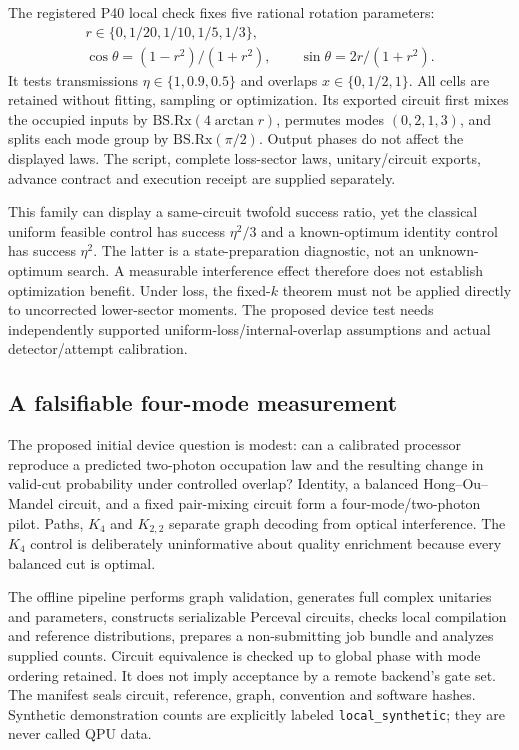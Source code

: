 The registered P40 local check fixes five rational rotation parameters:
\begin{gather*}
 r\in\{0,1/20,1/10,1/5,1/3\},\\
 \cos\theta=(1-r^2)/(1+r^2),\qquad \sin\theta=2r/(1+r^2).
\end{gather*}
It tests transmissions $\eta\in\{1,0.9,0.5\}$ and overlaps $x\in\{0,1/2,1\}$. All \CalibrationCellCount{} cells are retained without fitting, sampling or optimization. Its exported circuit first mixes the occupied inputs by $\mathrm{BS.Rx}(4\arctan r)$, permutes modes $(0,2,1,3)$, and splits each mode group by $\mathrm{BS.Rx}(\pi/2)$. Output phases do not affect the displayed laws. The script, complete loss-sector laws, unitary/circuit exports, advance contract and execution receipt are supplied separately.

This family can display a same-circuit twofold success ratio, yet the classical uniform feasible control has success $\eta^2/3$ and a known-optimum identity control has success $\eta^2$. The latter is a state-preparation diagnostic, not an unknown-optimum search. A measurable interference effect therefore does not establish optimization benefit. Under loss, the fixed-$k$ theorem must not be applied directly to uncorrected lower-sector moments. The proposed device test needs independently supported uniform-loss/internal-overlap assumptions and actual detector/attempt calibration.

\subsection{A falsifiable four-mode measurement}
The proposed initial device question is modest: can a calibrated processor reproduce a predicted two-photon occupation law and the resulting change in valid-cut probability under controlled overlap? Identity, a balanced Hong--Ou--Mandel circuit, and a fixed pair-mixing circuit form a four-mode/two-photon pilot. Paths, $K_4$ and $K_{2,2}$ separate graph decoding from optical interference. The $K_4$ control is deliberately uninformative about quality enrichment because every balanced cut is optimal.

The offline pipeline performs graph validation, generates full complex unitaries and parameters, constructs serializable Perceval circuits, checks local compilation and reference distributions, prepares a non-submitting job bundle and analyzes supplied counts. Circuit equivalence is checked up to global phase with mode ordering retained. It does not imply acceptance by a remote backend's gate set. The manifest seals circuit, reference, graph, convention and software hashes. Synthetic demonstration counts are explicitly labeled \texttt{local\_synthetic}; they are never called QPU data.

